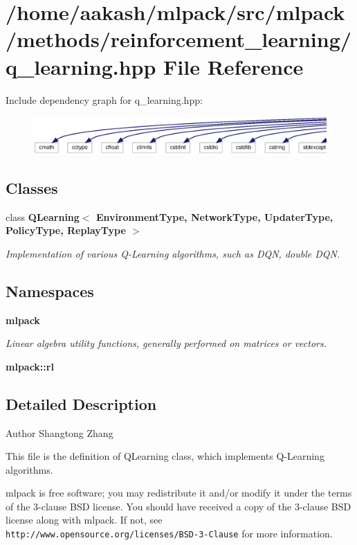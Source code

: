 \section{/home/aakash/mlpack/src/mlpack/methods/reinforcement\+\_\+learning/q\+\_\+learning.hpp File Reference}
\label{q__learning_8hpp}
Include dependency graph for q\+\_\+learning.\+hpp\+:
\nopagebreak
\begin{figure}[H]
\begin{center}
\leavevmode
\includegraphics[width=350pt]{q__learning_8hpp__incl}
\end{center}
\end{figure}
\subsection*{Classes}
\begin{DoxyCompactItemize}
\item 
class \textbf{ Q\+Learning$<$ Environment\+Type, Network\+Type, Updater\+Type, Policy\+Type, Replay\+Type $>$}
\begin{DoxyCompactList}\small\item\em Implementation of various Q-\/\+Learning algorithms, such as D\+QN, double D\+QN. \end{DoxyCompactList}\end{DoxyCompactItemize}
\subsection*{Namespaces}
\begin{DoxyCompactItemize}
\item 
 \textbf{ mlpack}
\begin{DoxyCompactList}\small\item\em Linear algebra utility functions, generally performed on matrices or vectors. \end{DoxyCompactList}\item 
 \textbf{ mlpack\+::rl}
\end{DoxyCompactItemize}


\subsection{Detailed Description}
\begin{DoxyAuthor}{Author}
Shangtong Zhang
\end{DoxyAuthor}
This file is the definition of Q\+Learning class, which implements Q-\/\+Learning algorithms.

mlpack is free software; you may redistribute it and/or modify it under the terms of the 3-\/clause B\+SD license. You should have received a copy of the 3-\/clause B\+SD license along with mlpack. If not, see {\tt http\+://www.\+opensource.\+org/licenses/\+B\+S\+D-\/3-\/\+Clause} for more information. 